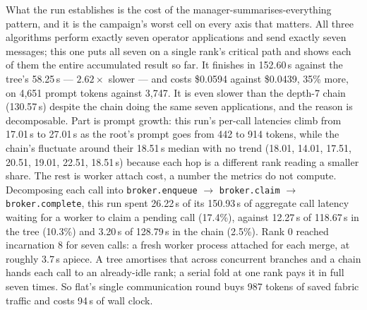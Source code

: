\documentclass[11pt]{article}
\begin{document}
What the run establishes is the cost of the manager-summarises-everything pattern, and
it is the campaign's worst cell on every axis that matters. All three algorithms perform
exactly seven operator applications and send exactly seven messages; this one puts all
seven on a single rank's critical path and shows each of them the entire accumulated
result so far. It finishes in 152.60\,s against the tree's 58.25\,s --- $2.62\times$
slower --- and costs \$0.0594 against \$0.0439, 35\% more, on 4{,}651 prompt tokens
against 3{,}747. It is even slower than the depth-7 chain (130.57\,s) despite the chain
doing the same seven applications, and the reason is decomposable. Part is prompt growth:
this run's per-call latencies climb from 17.01\,s to 27.01\,s as the root's prompt goes
from 442 to 914 tokens, while the chain's fluctuate around their 18.51\,s median with no
trend (18.01, 14.01, 17.51, 20.51, 19.01, 22.51, 18.51\,s) because each hop is a
different rank reading a smaller share. The rest is worker attach cost, a number the
metrics do not compute. Decomposing each call into \texttt{broker.enqueue} $\to$
\texttt{broker.claim} $\to$ \texttt{broker.complete}, this run spent 26.22\,s of its
150.93\,s of aggregate call latency waiting for a worker to claim a pending call
(17.4\%), against 12.27\,s of 118.67\,s in the tree (10.3\%) and 3.20\,s of 128.79\,s in
the chain (2.5\%). Rank 0 reached incarnation 8 for seven calls: a fresh worker process
attached for each merge, at roughly 3.7\,s apiece. A tree amortises that across
concurrent branches and a chain hands each call to an already-idle rank; a serial fold at
one rank pays it in full seven times. So flat's single communication round buys 987
tokens of saved fabric traffic and costs 94\,s of wall clock.
\end{document}
